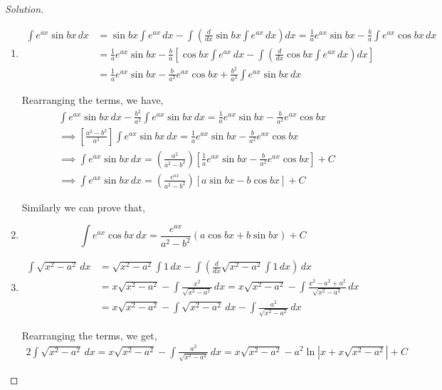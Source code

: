 \documentclass{book}
\theoremstyle{definition}
\newenvironment{solution}
    {\begin{proof}[Solution]}
    {\end{proof}}
\begin{document}
\begin{solution}
\begin{enumerate}[label=(\roman*)]

\item 
\begin{align*}
    \int e^{ax}\sin bx\,dx&=\sin bx\int e^{ax}\,dx-\int \left(\frac{d}{dx}\sin bx\int e^{ax}\,dx\right)dx = \frac{1}{a}e^{ax}\sin bx-\frac{b}{a}\int e^{ax}\cos bx\,dx \\ 
    &= \frac{1}{a}e^{ax}\sin bx-\frac{b}{a}\left[\cos bx\int e^{ax}\,dx-\int(\frac{d}{dx}\cos bx\int e^{ax}\,dx)dx\right] \\
    &= \frac{1}{a}e^{ax}\sin bx-\frac{b}{a^2}e^{ax}\cos bx+\frac{b^2}{a^2}\int e^{ax}\sin bx\,dx
\end{align*}

Rearranging the terms, we have,
\begin{align*}
    & \int e^{ax}\sin bx\,dx-\frac{b^2}{a^2}\int e^{ax}\sin bx\,dx = \frac{1}{a}e^{ax}\sin bx-\frac{b}{a^2}e^{ax}\cos bx \\
    &\implies \left[\frac{a^2-b^2}{a^2}\right]\int e^{ax}\sin bx\,dx = \frac{1}{a}e^{ax}\sin bx-\frac{b}{a^2}e^{ax}\cos bx \\
    &\implies \int e^{ax}\sin bx\,dx = \left(\frac{a^2}{a^2-b^2}\right)\left[\frac{1}{a}e^{ax}\sin bx-\frac{b}{a^2}e^{ax}\cos bx\right]+C \\
    &\implies \int e^{ax}\sin bx\,dx = \left(\frac{e^{ax}}{a^2-b^2}\right)\left[a\sin bx-b\cos bx\right]+C
\end{align*}

Similarly we can prove that,
\item 
\[
\int e^{ax}\cos bx\,dx=\frac{e^{ax}}{a^2-b^2}(a\cos bx+b\sin bx)+C
\]

\item 
\begin{align*}
    \int \sqrt{x^2-a^2}\,dx&=\sqrt{x^2-a^2}\int1\,dx-\int\left(\frac{d}{dx}\sqrt{x^2-a^2}\int1\,dx\right)\,dx \\
    &= x\sqrt{x^2-a^2}-\int\frac{x^2}{\sqrt{x^2-a^2}}\,dx = x\sqrt{x^2-a^2}-\int\frac{x^2-a^2+a^2}{\sqrt{x^2-a^2}}\,dx \\
    &= x\sqrt{x^2-a^2}-\int\sqrt{x^2-a^2}\,dx-\int\frac{a^2}{\sqrt{x^2-a^2}}\,dx
\end{align*}

Rearranging the terms, we get,
\begin{align*}
    2\int \sqrt{x^2-a^2}\,dx=x\sqrt{x^2-a^2}-\int\frac{a^2}{\sqrt{x^2-a^2}}\,dx = x\sqrt{x^2-a^2}-a^2\ln|x+x\sqrt{x^2-a^2}|+C
\end{align*}


\end{enumerate}
\end{solution}
\end{document}
